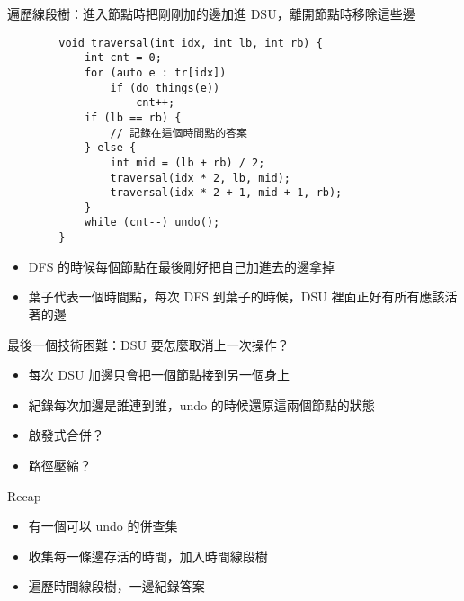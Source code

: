\begin{frame}[fragile]{\ebtitle}
    遍歷線段樹：進入節點時把剛剛加的邊加進 DSU，離開節點時移除這些邊
    \begin{verbatim}
        void traversal(int idx, int lb, int rb) {
            int cnt = 0;
            for (auto e : tr[idx])
                if (do_things(e))
                    cnt++;
            if (lb == rb) {
                // 記錄在這個時間點的答案
            } else {
                int mid = (lb + rb) / 2;
                traversal(idx * 2, lb, mid);
                traversal(idx * 2 + 1, mid + 1, rb); 
            }
            while (cnt--) undo();
        }
    \end{verbatim}
\end{frame}


\begin{frame}{\ebtitle}
    \begin{itemize}
        \item DFS 的時候每個節點在最後剛好把自己加進去的邊拿掉
        \item 葉子代表一個時間點，每次 DFS 到葉子的時候，DSU 裡面正好有所有應該活著的邊
    \end{itemize}
\end{frame}

\begin{frame}{\ebtitle}
    最後一個技術困難：DSU 要怎麼取消上一次操作？

    \begin{itemize}
        \item 每次 DSU 加邊只會把一個節點接到另一個身上
        \item 紀錄每次加邊是誰連到誰，undo 的時候還原這兩個節點的狀態
        \item 啟發式合併？ 
        \item 路徑壓縮？ 
    \end{itemize}
\end{frame}

\begin{frame}{\ebtitle}
    Recap
    
    \begin{itemize}
        \item 有一個可以 undo 的併查集
        \item 收集每一條邊存活的時間，加入時間線段樹
        \item 遍歷時間線段樹，一邊紀錄答案
    \end{itemize}
\end{frame}

